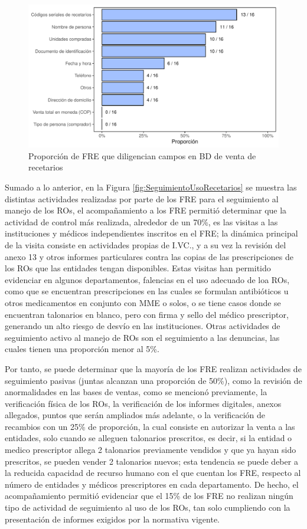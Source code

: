 \documentclass[
]{book}
\begin{document}
\begin{figure}
\includegraphics[width=0.85\linewidth]{InformeFinal_files/figure-latex/BD-diligBDRecet-1} \caption{Proporción de FRE que diligencian campos en BD de venta de recetarios}\label{fig:BD-diligBDRecet}
\end{figure}

Sumado a lo anterior, en la Figura \ref{fig:SeguimientoUsoRecetarios} se muestra las distintas actividades realizadas por parte de los FRE para el seguimiento al manejo de los ROs, el acompañamiento a los FRE permitió determinar que la actividad de control más realizada, alrededor de un 70\%, es las visitas a las instituciones y médicos independientes inscritos en el FRE; la dinámica principal de la visita consiste en actividades propias de I.VC., y a su vez la revisión del anexo 13 y otros informes particulares contra las copias de las prescripciones de los ROs que las entidades tengan disponibles. Estas visitas han permitido evidenciar en algunos departamentos, falencias en el uso adecuado de loa ROs, como que se encuentran prescripciones en las cuales se formulan antibióticos u otros medicamentos en conjunto con MME o solos, o se tiene casos donde se encuentran talonarios en blanco, pero con firma y sello del médico prescriptor, generando un alto riesgo de desvío en las instituciones. Otras actividades de seguimiento activo al manejo de ROs son el seguimiento a las denuncias, las cuales tienen una proporción menor al 5\%.

Por tanto, se puede determinar que la mayoría de los FRE realizan actividades de seguimiento pasivas (juntas alcanzan una proporción de 50\%), como la revisión de anormalidades en las bases de ventas, como se mencionó previamente, la verificación física de los ROs, la verificación de los informes digitales, anexos allegados, puntos que serán ampliados más adelante, o la verificación de recambios con un 25\% de proporción, la cual consiste en autorizar la venta a las entidades, solo cuando se alleguen talonarios prescritos, es decir, si la entidad o medico prescriptor allega 2 talonarios previamente vendidos y que ya hayan sido prescritos, se pueden vender 2 talonarios nuevos; esta tendencia se puede deber a la reducida capacidad de recurso humano con el que cuentan los FRE, respecto al número de entidades y médicos prescriptores en cada departamento. De hecho, el acompañamiento permitió evidenciar que el 15\% de los FRE no realizan ningún tipo de actividad de seguimiento al uso de los ROs, tan solo cumpliendo con la presentación de informes exigidos por la normativa vigente.
\end{document}
